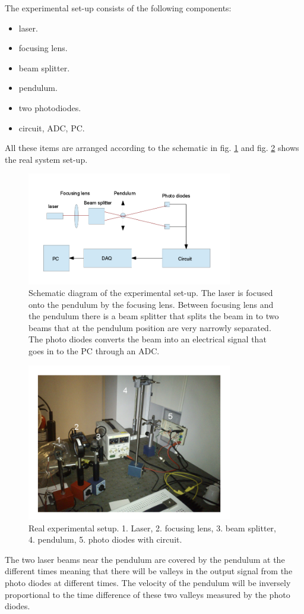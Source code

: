 The experimental set-up consists of the following components: 
\begin{itemize}
\item laser.
\item focusing lens.
\item beam splitter.
\item pendulum.
\item two photodiodes.
\item circuit, ADC, PC.
\end{itemize}
All these items are arranged according to the schematic in fig. \ref{fig:expsetup} and fig. \ref{fig:expsetupLive} shows the real system set-up.
\begin{figure}[htbp]
	\centering
	\includegraphics[width=0.8\textwidth]{img/expsetup}
	\caption{Schematic diagram of the experimental set-up. The laser is focused onto the pendulum by the focusing lens. Between focusing lens and the pendulum there is a beam splitter that splits the beam in to two beams that at the pendulum position are very narrowly separated. The photo diodes converts the beam into an electrical signal that goes in to the PC through an ADC.}
	\label{fig:expsetup}
\end{figure}
\begin{figure}[htbp]
	\centering
	\includegraphics[width=0.8\textwidth]{img/expsetupLive}
	\caption{Real experimental setup. 1. Laser, 2. focusing lens, 3. beam splitter, 4. pendulum,
	5. photo diodes with circuit.} %
	\label{fig:expsetupLive}
\end{figure}
The two laser beams near the pendulum are covered by the pendulum at the different times meaning that there will be valleys in the output signal from the photo diodes at different times.
The velocity of the pendulum will be inversely proportional to the time difference of these two valleys measured by the photo diodes.

